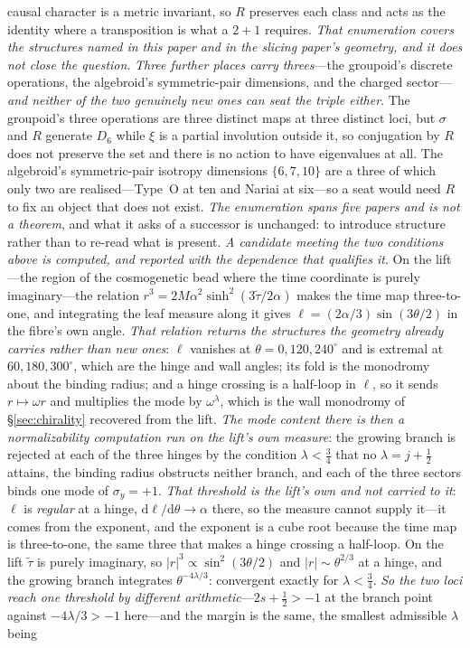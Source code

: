 \documentclass[11pt]{article}
\newcommand{\dd}{\mathrm{d}}
\begin{document}
causal character is a metric invariant, so $R$ preserves each class and acts as the identity where a transposition is what a $2{+}1$ requires. \emph{That enumeration covers the structures named in this paper and in the slicing paper's geometry, and it does not close the question}. \emph{Three further places carry threes}---the groupoid's discrete operations, the algebroid's symmetric-pair dimensions, and the charged sector---\emph{and neither of the two genuinely new ones can seat the triple either}. The groupoid's three operations are three distinct maps at three distinct loci, but $\sigma$ and $R$ generate $D_6$ while $\xi$ is a partial involution outside it, so conjugation by $R$ does not preserve the set and there is no action to have eigenvalues at all. The algebroid's symmetric-pair isotropy dimensions $\{6,7,10\}$ are a three of which only two are realised---Type~O at ten and Nariai at six---so a seat would need $R$ to fix an object that does not exist. \emph{The enumeration spans five papers and is not a theorem}, and what it asks of a successor is unchanged: to introduce structure rather than to re-read what is present. \emph{A candidate meeting the two conditions above is computed, and reported with the dependence that qualifies it}. On the lift---the region of the cosmogenetic bead where the time coordinate is purely imaginary---the relation $r^{3}=2M\alpha^{2}\sinh^{2}(3\tilde\tau/2\alpha)$ makes the time map three-to-one, and integrating the leaf measure along it gives $\ell=(2\alpha/3)\sin(3\theta/2)$ in the fibre's own angle. \emph{That relation returns the structures the geometry already carries rather than new ones}: $\ell$ vanishes at $\theta=0,120,240^{\circ}$ and is extremal at $60,180,300^{\circ}$, which are the hinge and wall angles; its fold is the monodromy about the binding radius; and a hinge crossing is a half-loop in $\ell$, so it sends $r\mapsto\omega r$ and multiplies the mode by $\omega^{\lambda}$, which is the wall monodromy of \S\ref{sec:chirality} recovered from the lift. \emph{The mode content there is then a normalizability computation run on the lift's own measure}: the growing branch is rejected at each of the three hinges by the condition $\lambda<\tfrac34$ that no $\lambda=j+\tfrac12$ attains, the binding radius obstructs neither branch, and each of the three sectors binds one mode of $\sigma_y=+1$. \emph{That threshold is the lift's own and not carried to it}: $\ell$ is \emph{regular} at a hinge, $\dd\ell/\dd\theta\to\alpha$ there, so the measure cannot supply it---it comes from the exponent, and the exponent is a cube root because the time map is three-to-one, the same three that makes a hinge crossing a half-loop. On the lift $\tilde\tau$ is purely imaginary, so $\lvert r\rvert^{3}\propto\sin^{2}(3\theta/2)$ and $\lvert r\rvert\sim\theta^{2/3}$ at a hinge, and the growing branch integrates $\theta^{-4\lambda/3}$: convergent exactly for $\lambda<\tfrac34$. \emph{So the two loci reach one threshold by different arithmetic}---$2s+\tfrac12>-1$ at the branch point against $-4\lambda/3>-1$ here---and the margin is the same, the smallest admissible $\lambda$ being 
\end{document}
